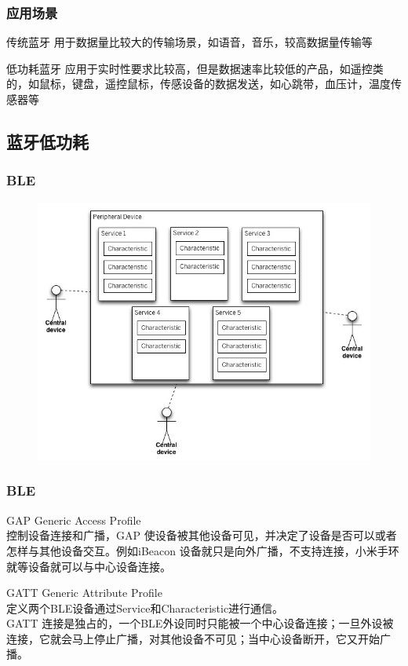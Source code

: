 \documentclass[UTF8]{ctexbeamer}
\begin{document}
\begin{frame}
	\frametitle{应用场景}
			\begin{block}{传统蓝牙}
				用于数据量比较大的传输场景，如语音，音乐，较高数据量传输等
			\end{block}
			\begin{block}{低功耗蓝牙}
				应用于实时性要求比较高，但是数据速率比较低的产品，如遥控类的，如鼠标，键盘，遥控鼠标，传感设备的数据发送，如心跳带，血压计，温度传感器等
			\end{block}
\end{frame}

\subsection{蓝牙低功耗}
\begin{frame}
  \frametitle{BLE}
	\begin{figure}
		\includegraphics[width=0.7\linewidth]{ble-model.jpg}
	\end{figure}
\end{frame}

\begin{frame}
  \frametitle{BLE}
  \begin{block}{GAP}
Generic Access Profile \\ 控制设备连接和广播，GAP 使设备被其他设备可见，并决定了设备是否可以或者怎样与其他设备交互。例如iBeacon 设备就只是向外广播，不支持连接，小米手环就等设备就可以与中心设备连接。
  \end{block}
  \begin{block}{GATT}
    Generic Attribute Profile \\ 定义两个BLE设备通过Service和Characteristic进行通信。\\
    GATT 连接是独占的，一个BLE外设同时只能被一个中心设备连接；一旦外设被连接，它就会马上停止广播，对其他设备不可见；当中心设备断开，它又开始广播。
  \end{block}
\end{frame}
\end{document}
